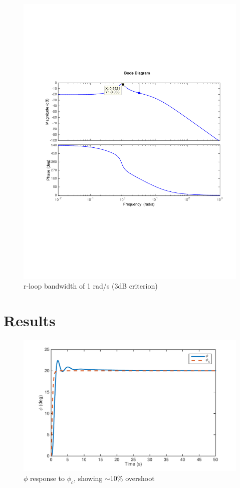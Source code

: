 \documentclass[12pt]{article}
\begin{document}
\begin{figure}[h!]
\begin{center}
\includegraphics[width=1\textwidth]{figures/r_delta_r_closed_loop}
\caption{r-loop bandwidth of 1 rad/s (3dB criterion)}
\end{center}
\end{figure}

\clearpage

\section{Results}

\begin{figure}[h!]
\begin{center}
\includegraphics[height=.5\textheight]{figures/phi}
\caption{$\phi$ response to $\phi_c$, showing $\sim 10\%$ overshoot}
\end{center}
\end{figure}
\end{document}
